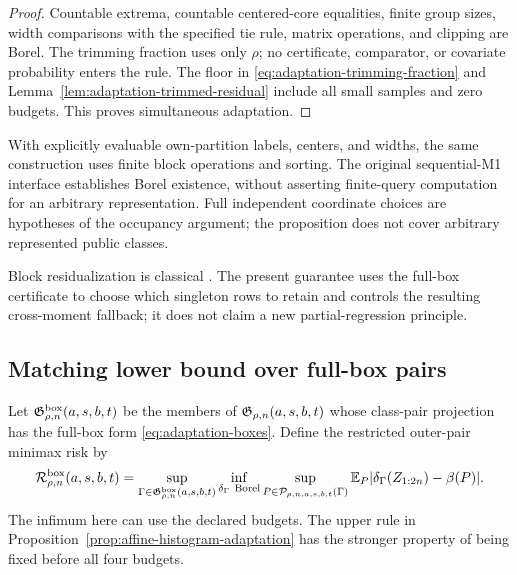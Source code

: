 \begin{proof}
Countable extrema, countable centered-core equalities, finite group
sizes, width comparisons with the specified tie rule, matrix operations,
and clipping are Borel. The trimming fraction uses only $\rho$; no
certificate, comparator, or covariate probability enters the rule.
The floor in \eqref{eq:adaptation-trimming-fraction} and
Lemma~\ref{lem:adaptation-trimmed-residual} include all small samples
and zero budgets. This proves simultaneous adaptation.
\end{proof}

With explicitly evaluable own-partition labels, centers, and widths,
the same construction uses finite block operations and sorting.
The original sequential-M1 interface establishes Borel existence,
without asserting finite-query computation for an arbitrary
representation. Full independent coordinate choices are hypotheses of
the occupancy argument; the proposition does not cover arbitrary
represented public classes.

Block residualization is classical \citep{cattaneo2018alternative}.
The present guarantee uses the full-box certificate to choose which
singleton rows to retain and controls the resulting cross-moment fallback;
it does not claim a new partial-regression principle.

\subsection{Matching lower bound over full-box pairs}

Let $\mathfrak G^{\rm box}_{\rho,n}(a,s,b,t)$ be the members of
$\mathfrak G_{\rho,n}(a,s,b,t)$ whose class-pair projection has the
full-box form \eqref{eq:adaptation-boxes}. Define the restricted
outer-pair minimax risk by
\begin{equation}
 \mathcal R^{\rm box}_{\rho,n}(a,s,b,t)
 =\sup_{\Gamma\in\mathfrak G^{\rm box}_{\rho,n}(a,s,b,t)}
   \inf_{\delta_\Gamma\ {\rm Borel}}
   \sup_{P\in\mathcal P_{\rho,n,a,s,b,t}(\Gamma)}
       \mathbb E_P|\delta_\Gamma(Z_{1:2n})-\beta(P)|.
 \label{eq:adaptation-box-minimax-risk}
\end{equation}
The infimum here can use the declared budgets. The upper rule in
Proposition~\ref{prop:affine-histogram-adaptation} has the stronger
property of being fixed before all four budgets.

